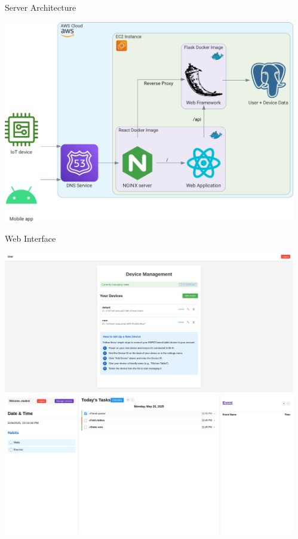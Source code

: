 \documentclass[final]{beamer}
\newlength{\sepwidth}
\newlength{\colwidth}
\newcommand{\separatorcolumn}{\begin{column}{\sepwidth}\end{column}}
\begin{document}
\begin{frame}[t]
\begin{columns}[t]
\begin{column}{\colwidth}
      \begin{block}{Server Architecture}
        \vskip 0.5cm
        \begin{center}
          \includegraphics[width = \linewidth]{data_flow.png}
        \end{center}
      \end{block}

      \begin{block}{Web Interface}
        \begin{center}
          \vskip 0.5cm
          \includegraphics[width = 0.45 \textwidth]{web_devices.png}
          \hfill
          \includegraphics[width = 0.45 \textwidth]{web_mainview.png}
        \end{center}
      \end{block}

    \end{column}

    \separatorcolumn

  \end{columns}
\end{frame}
\end{document}
